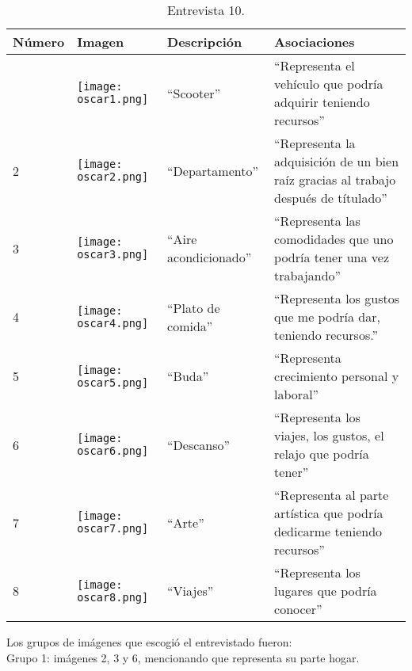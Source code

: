 \begin{table}[H]
\centering
\begin{tabular}{>{\centering\arraybackslash}m{1cm} >{\centering\arraybackslash}m{2cm} >{\arraybackslash}m{5cm}>{\arraybackslash}m{5cm}}
\hline
Número  & Imagen & Descripción & Asociaciones \\
\hline \hline

1 & \texttt{[image: oscar1.png]} & ``Scooter'' & ``Representa el vehículo que podría adquirir teniendo recursos'' \\
\hline

2 & \texttt{[image: oscar2.png]} & ``Departamento'' & ``Representa la adquisición de un bien raíz gracias al trabajo después de títulado'' \\
\hline

3 & \texttt{[image: oscar3.png]} & ``Aire acondicionado'' & ``Representa las comodidades que uno podría tener una vez trabajando'' \\
\hline

4 & \texttt{[image: oscar4.png]} & ``Plato de comida'' & ``Representa los gustos que me podría dar, teniendo recursos.'' \\
\hline

5 & \texttt{[image: oscar5.png]} & ``Buda'' & ``Representa crecimiento personal y laboral'' \\
\hline

6 & \texttt{[image: oscar6.png]} & ``Descanso'' & ``Representa los viajes, los gustos, el relajo que podría tener'' \\
\hline

7 & \texttt{[image: oscar7.png]} & ``Arte'' & ``Representa al parte artística que podría dedicarme teniendo recursos'' \\
\hline

8 & \texttt{[image: oscar8.png]} & ``Viajes'' & ``Representa los lugares que podría conocer'' \\
\hline

\end{tabular}
\caption{Entrevista 10.}
\label{tabla:oscar}
\end{table}

Los grupos de imágenes que escogió el entrevistado fueron:\\

Grupo 1: imágenes 2, 3 y 6, mencionando que representa su parte hogar. \\

